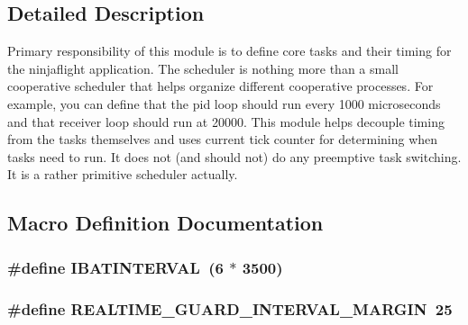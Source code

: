 \subsection{Detailed Description}
Primary responsibility of this module is to define core tasks and their timing for the ninjaflight application. The scheduler is nothing more than a small cooperative scheduler that helps organize different cooperative processes. For example, you can define that the pid loop should run every 1000 microseconds and that receiver loop should run at 20000. This module helps decouple timing from the tasks themselves and uses current tick counter for determining when tasks need to run. It does not (and should not) do any preemptive task switching. It is a rather primitive scheduler actually. 

\subsection{Macro Definition Documentation}
\hypertarget{group__scheduler_gabd955c9494c8c249d7861527da1220bc}{
\subsubsection[{I\+B\+A\+T\+I\+N\+T\+E\+R\+V\+A\+L}]{\setlength{\rightskip}{0pt plus 5cm}\#define I\+B\+A\+T\+I\+N\+T\+E\+R\+V\+A\+L~(6 $\ast$ 3500)}}\label{group__scheduler_gabd955c9494c8c249d7861527da1220bc}
\hypertarget{group__scheduler_gaf1515d6de09f018d8f29714b03a80704}{
\subsubsection[{R\+E\+A\+L\+T\+I\+M\+E\+\_\+\+G\+U\+A\+R\+D\+\_\+\+I\+N\+T\+E\+R\+V\+A\+L\+\_\+\+M\+A\+R\+G\+I\+N}]{\setlength{\rightskip}{0pt plus 5cm}\#define R\+E\+A\+L\+T\+I\+M\+E\+\_\+\+G\+U\+A\+R\+D\+\_\+\+I\+N\+T\+E\+R\+V\+A\+L\+\_\+\+M\+A\+R\+G\+I\+N~25}}\label{group__scheduler_gaf1515d6de09f018d8f29714b03a80704}
